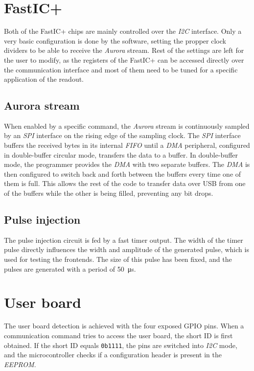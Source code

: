 \section{FastIC+}
Both of the FastIC+ chips are mainly controlled over the \emph{I2C} interface. Only a very basic configuration is done by the software, setting the propper clock dividers to be able to receive the \emph{Aurora} stream. Rest of the settings are left for the user to modify, as the registers of the FastIC+ can be accessed directly over the communication interface and most of them need to be tuned for a specific application of the readout.
\subsection{Aurora stream}
When enabled by a specific command, the \emph{Aurora} stream is continuously sampled by an \emph{SPI} interface on the rising edge of the sampling clock. The \emph{SPI} interface buffers the received bytes in its internal \emph{FIFO} until a \emph{DMA} peripheral, configured in double-buffer circular mode, transfers the data to a buffer. In double-buffer mode, the programmer provides the \emph{DMA} with two separate buffers. The \emph{DMA} is then configured to switch back and forth between the buffers every time one of them is full. This allows the rest of the code to transfer data over USB from one of the buffers while the other is being filled, preventing any bit drops.

\subsection{Pulse injection}
The pulse injection circuit is fed by a fast timer output. The width of the timer pulse directly influences the width and amplitude of the generated pulse, which is used for testing the frontends. The size of this pulse has been fixed, and the pulses are generated with a period of \SI{50}{\micro\second}.
\newpage
\section{User board}

The user board detection is achieved with the four exposed GPIO pins. When a communication command tries to access the user board, the short ID is first obtained. If the short ID equals \verb|0b1111|, the pins are switched into \emph{I2C} mode, and the microcontroller checks if a configuration header is present in the \emph{EEPROM}. 


